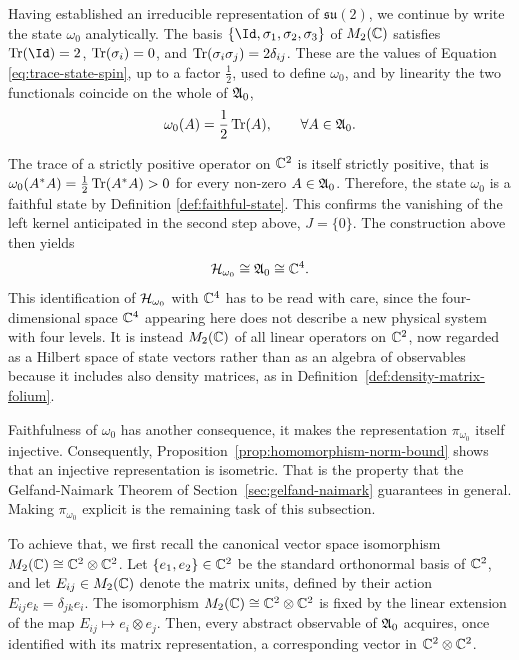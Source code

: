  	Having established an irreducible representation of $\mathfrak{su}(2)$, we continue by write the state $\omega_0$ analytically. The basis $\{\Id,\sigma_1,\sigma_2,\sigma_3\}$ of $M_2(\mathbb{C})$ satisfies $\Tr(\Id)=2$, $\Tr(\sigma_i)=0$, and $\Tr(\sigma_i\sigma_j)=2\delta_{ij}$. These are the values of Equation \eqref{eq:trace-state-spin}, up to a factor $\tfrac12$, used to define $\omega_0$, and by linearity the two functionals coincide on the whole of $\mathfrak{A}_0$,
 	\begin{equation}
 		\omega_0(A)=\frac12\Tr(A), \qquad \forall A \in \mathfrak{A}_0.
 	\end{equation}
 	
 	The trace of a strictly positive operator on $\mathbb{C}^2$ is itself strictly positive, that is $\omega_0(A^*A)=\frac12\Tr(A^*A) > 0$ for every non-zero $A \in \mathfrak{A}_0$. Therefore, the state $\omega_0$ is a faithful state by Definition \ref{def:faithful-state}. This confirms the vanishing of the left kernel anticipated in the second step above, $J=\{0\}$. The construction above then yields
 	\begin{equation}
 		\H_{\omega_0} \cong \A_0 \cong \C^4.
 	\end{equation}
 	This identification of $\H_{\omega_0}$ with $\mathbb{C}^4$ has to be read with care, since the four-dimensional space $\mathbb{C}^4$ appearing here does not describe a new physical system with four levels. It is instead $M_2(\mathbb{C})$ of all linear operators on $\mathbb{C}^2$, now regarded as a Hilbert space of state vectors rather than as an algebra of observables because it includes also density matrices, as in Definition~\ref{def:density-matrix-folium}.
 	
 	Faithfulness of $\omega_0$ has another consequence, it makes the representation $\pi_{\omega_0}$ itself injective. Consequently, Proposition~\ref{prop:homomorphism-norm-bound} shows that an injective representation is isometric. That is the property that the Gelfand-Naimark Theorem of Section~\ref{sec:gelfand-naimark} guarantees in general. Making $\pi_{\omega_0}$ explicit is the remaining task of this subsection. 
 	
 	To achieve that, we first recall the canonical vector space isomorphism $M_2(\mathbb{C}) \cong \mathbb{C}^2 \otimes \mathbb{C}^2$. Let $\{e_1,e_2\} \in \mathbb{C}^2$ be the standard orthonormal basis of $\mathbb{C}^2$, and let $E_{ij} \in M_2(\mathbb{C})$ denote the matrix units, defined by their action $E_{ij}e_k = \delta_{jk}e_i$. The isomorphism $M_2(\mathbb{C})\cong\mathbb{C}^2\otimes\mathbb{C}^2$ is fixed by the linear extension of the map $E_{ij} \mapsto e_i \otimes e_j$. Then, every abstract observable of $\mathfrak{A}_0$ acquires, once identified with its matrix representation, a corresponding vector in $\mathbb{C}^2\otimes\mathbb{C}^2$.
 	

